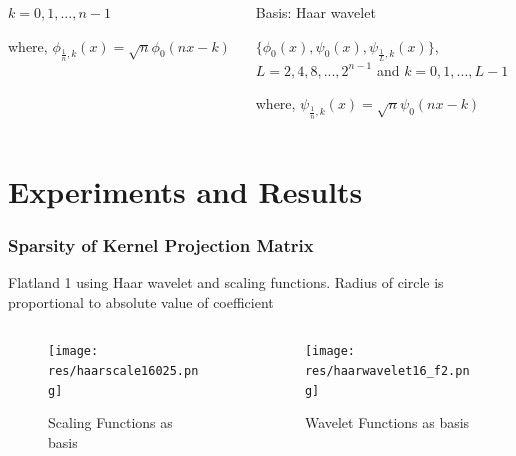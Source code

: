 \begin{frame}
\begin{columns}[T]
\begin{column}{.5\textwidth}
                   $k=0,1,...,n-1$\\
        \vspace{0.5cm}

                  where, 
                  $\phi_{\frac{1}{n},k}(x)={\sqrt{n}}\phi_0(nx-k)$

        \end{column}
        \begin{column}{.5\textwidth}
                 Basis: Haar wavelet 

            \vspace{0.5cm}

                 \centering
                  $\{ \phi_0(x),\psi_0(x), \psi_{\frac{1}{L},k}(x)\}$,\\ \vspace{0.2cm}
                   $L=2,4,8,...,2^{n-1}$ and $k=0,1,...,L-1$\\
        \vspace{0.5cm}
                  
                  where, 
                  $\psi_{\frac{1}{n},k}(x)={\sqrt{n}}\psi_0(nx-k)$

        \end{column}
      \end{columns}

    \end{frame}


\section{Experiments and Results}


\begin{frame}\frametitle{Sparsity of Kernel Projection Matrix}
Flatland 1 using Haar wavelet and scaling functions.
Radius of circle is proportional to  absolute value of coefficient 


    \begin{columns}[T]
      \begin{column}{.5\textwidth}
      
              \begin{figure}
              \centering
              \texttt{[image: res/haarscale16025.png]}
              \caption{Scaling Functions as basis}
              \label{fig_e_vs_n_f1}
              \end{figure}

      \end{column}
      \begin{column}{.5\textwidth}
              \begin{figure}
              \centering
              \texttt{[image: res/haarwavelet16\_f2.png]}
              \caption{Wavelet Functions as basis}
              \label{fig_e_vs_n_f2}
              \end{figure}

        \end{column}
      \end{columns}
\end{frame}


